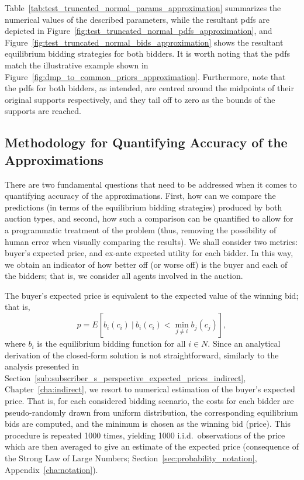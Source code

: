 Table~\ref{tab:test_truncated_normal_params_approximation} summarizes the numerical values of the described parameters, while the resultant pdfs are depicted in Figure~\ref{fig:test_truncated_normal_pdfs_approximation}, and Figure~\ref{fig:test_truncated_normal_bids_approximation} shows the resultant equilibrium bidding strategies for both bidders. It is worth noting that the pdfs match the illustrative example shown in Figure~\ref{fig:dmp_to_common_priors_approximation}. Furthermore, note that the pdfs for both bidders, as intended, are centred around the midpoints of their original supports respectively, and they tail off to zero as the bounds of the supports are reached.

\subsection{Methodology for Quantifying Accuracy of the Approximations} %
\label{sub:methodology_for_quantifying_accuracy_of_the_approximations_approximation}
There are two fundamental questions that need to be addressed when it comes to quantifying accuracy of the approximations. First, how can we compare the predictions (in terms of the equilibrium bidding strategies) produced by both auction types, and second, how such a comparison can be quantified to allow for a programmatic treatment of the problem (thus, removing the possibility of human error when visually comparing the results). We shall consider two metrics: buyer's expected price, and ex-ante expected utility for each bidder. In this way, we obtain an indicator of how better off (or worse off) is the buyer and each of the bidders; that is, we consider all agents involved in the auction.

The buyer's expected price is equivalent to the expected value of the winning bid; that is,
\begin{equation}
  \label{eq:expected_price_approximation}
  p = E[b_i(c_i) \:\vert\: b_i(c_i) < \min_{j\neq i} b_j(c_j)],
\end{equation}
where $b_i$ is the equilibrium bidding function for all $i\in N$. Since an analytical derivation of the closed-form solution is not straightforward, similarly to the analysis presented in Section~\ref{sub:subscriber_s_perspective_expected_prices_indirect}, Chapter~\ref{cha:indirect}, we resort to numerical estimation of the buyer's expected price. That is, for each considered bidding scenario, the costs for each bidder are pseudo-randomly drawn from uniform distribution, the corresponding equilibrium bids are computed, and the minimum is chosen as the winning bid (price). This procedure is repeated 1000 times, yielding 1000 i.i.d.~observations of the price which are then averaged to give an estimate of the expected price (consequence of the Strong Law of Large Numbers; Section~\ref{sec:probability_notation}, Appendix~\ref{cha:notation}).

